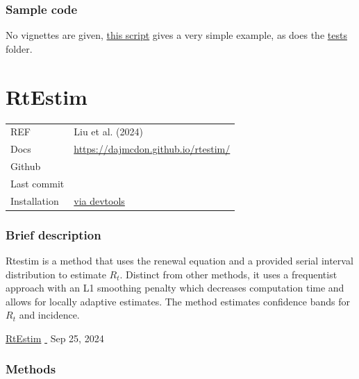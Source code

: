 \documentclass[
  letterpaper,
  DIV=11,
  numbers=noendperiod]{scrreprt}
\begin{document}
\subsection*{Sample code}\label{sample-code-10}

No vignettes are given,
\href{https://github.com/tobadia/R0/blob/master/demo/epid.demo.R}{this
script} gives a very simple example, as does the
\href{https://github.com/tobadia/R0/tree/master/tests}{tests} folder.

\chapter*{RtEstim}\label{rtestim}


\begin{longtable}[]{@{}
  >{\raggedright\arraybackslash}p{}
  >{\raggedright\arraybackslash}p{}@{}}
\toprule\noalign{}
\endhead
\bottomrule\noalign{}
\endlastfoot
REF & Liu et al. (2024) \\
Docs & \url{https://dajmcdon.github.io/rtestim/} \\
Github & \\
Last commit & \\
Installation & \href{https://dajmcdon.github.io/rtestim/}{via
devtools} \\
\end{longtable}

\subsection*{Brief description}\label{brief-description-13}

Rtestim is a method that uses the renewal equation and a provided serial
interval distribution to estimate \(R_t\). Distinct from other methods,
it uses a frequentist approach with an L1 smoothing penalty which
decreases computation time and allows for locally adaptive estimates.
The method estimates confidence bands for \(R_t\) and incidence.

\href{package_RtEstim.qmd}{RtEstim} \textbar{} \textbar{}
\href{https://github.com/dajmcdon/rtestim}{🔗} \textbar{} Sep 25,
2024\textbar{}

\subsection*{Methods}\label{methods-13}
\end{document}
